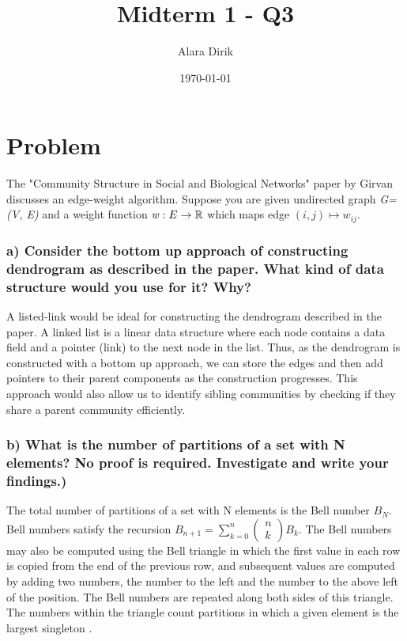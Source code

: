 \documentclass{article}
\title{Midterm 1 - Q3}
\author{Alara Dirik}
\date\today
\begin{document}
\maketitle 

\section*{Problem}
The "Community Structure in Social and Biological Networks" paper by Girvan {\bf \cite{Girvan2002CommunitySI}} discusses an edge-weight algorithm. Suppose you are given undirected graph {\it G=(V, E)} and a weight function ${\it w}: E \rightarrow \mathbb{R}$ which maps edge $(i, j) \mapsto w_{i j}$. 


\subsubsection*{a) Consider the bottom up approach of constructing dendrogram as described in the paper. What kind of data structure would you use for it? Why?}

A listed-link would be ideal for constructing the dendrogram described in the paper. A linked list is a linear data structure where each node contains a data field and a pointer (link) to the next node in the list. Thus, as the dendrogram is constructed with a bottom up  approach, we can store the edges and then add pointers to their parent components as the construction progresses. This approach would also allow us to identify sibling communities by checking if they share a parent community efficiently.

\subsubsection*{b) What is the number of partitions of a set with N elements? No proof is required. Investigate and write your findings.)}
The total number of partitions of a set with N elements is the Bell number $B_N$. Bell numbers satisfy the recursion $B_{n+1}=\sum_{k=0}^{n}\left(\begin{array}{l}n \\ k\end{array}\right) B_{k}$. The Bell numbers may also be computed using the Bell triangle in which the first value in each row is copied from the end of the previous row, and subsequent values are computed by adding two numbers, the number to the left and the number to the above left of the position. The Bell numbers are repeated along both sides of this triangle. The numbers within the triangle count partitions in which a given element is the largest singleton {\bf \cite{wiki:Partition-of-a-set}}.

\nocite{*}


\end{document}
